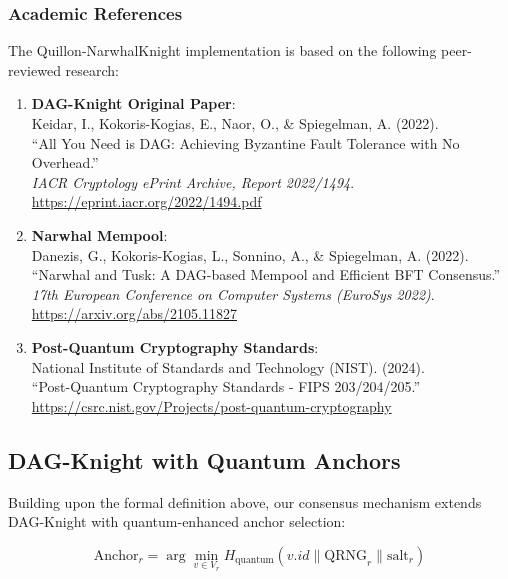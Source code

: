 \documentclass[11pt,a4paper]{article}
\begin{document}
\subsubsection{Academic References}

The Quillon-NarwhalKnight implementation is based on the following peer-reviewed research:

\begin{enumerate}
    \item \textbf{DAG-Knight Original Paper}: \\
    Keidar, I., Kokoris-Kogias, E., Naor, O., \& Spiegelman, A. (2022). \\
    ``All You Need is DAG: Achieving Byzantine Fault Tolerance with No Overhead.'' \\
    \textit{IACR Cryptology ePrint Archive, Report 2022/1494}. \\
    \url{https://eprint.iacr.org/2022/1494.pdf}

    \item \textbf{Narwhal Mempool}: \\
    Danezis, G., Kokoris-Kogias, L., Sonnino, A., \& Spiegelman, A. (2022). \\
    ``Narwhal and Tusk: A DAG-based Mempool and Efficient BFT Consensus.'' \\
    \textit{17th European Conference on Computer Systems (EuroSys 2022)}. \\
    \url{https://arxiv.org/abs/2105.11827}

    \item \textbf{Post-Quantum Cryptography Standards}: \\
    National Institute of Standards and Technology (NIST). (2024). \\
    ``Post-Quantum Cryptography Standards - FIPS 203/204/205.'' \\
    \url{https://csrc.nist.gov/Projects/post-quantum-cryptography}
\end{enumerate}

\subsection{DAG-Knight with Quantum Anchors}

Building upon the formal definition above, our consensus mechanism extends DAG-Knight with quantum-enhanced anchor selection:

\begin{equation}
\text{Anchor}_r = \arg\min_{v \in V_r} H_{\text{quantum}}(v.id \parallel \text{QRNG}_r \parallel \text{salt}_r)
\end{equation}
\end{document}
